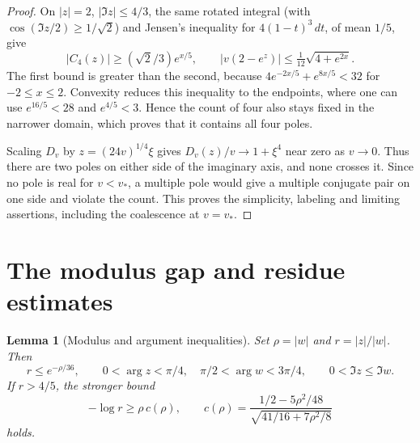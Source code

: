 \documentclass[11pt]{article}
\newtheorem{lemma}{Lemma}
\begin{document}
\begin{proof}
On \(|z|=2\), \(|\Im z|\le4/3\), the same rotated integral (with \(\cos(\Im z/2)\ge1/\sqrt2\)) and Jensen's inequality for \(4(1-t)^3\,dt\), of mean \(1/5\), give
\[
|C_4(z)|\ge(\sqrt2/3)e^{x/5},\qquad
|v(2-e^z)|\le \tfrac1{12}\sqrt{4+e^{2x}}.
\]
The first bound is greater than the second, because \(4e^{-2x/5}+e^{8x/5}<32\) for \(-2\le x\le2\). Convexity reduces this inequality to the endpoints, where one can use \(e^{16/5}<28\) and \(e^{4/5}<3\). Hence the count of four also stays fixed in the narrower domain, which proves that it contains all four poles.

Scaling \(D_v\) by \(z=(24v)^{1/4}\xi\) gives \(D_v(z)/v\to1+\xi^4\) near zero as \(v\to0\). Thus there are two poles on either side of the imaginary axis, and none crosses it. Since no pole is real for \(v<v_*\), a multiple pole would give a multiple conjugate pair on one side and violate the count. This proves the simplicity, labeling and limiting assertions, including the coalescence at \(v=v_*\).
\end{proof}

\section{The modulus gap and residue estimates}

\begin{lemma}[Modulus and argument inequalities]\label{lem:gap}
Set \(\rho=|w|\) and \(r=|z|/|w|\). Then
\[
r\le e^{-\rho/36},\qquad
0<\arg z<\pi/4,\quad \pi/2<\arg w<3\pi/4,\qquad
0<\Im z\le\Im w.
\]
If \(r>4/5\), the stronger bound
\begin{equation}\label{eq:gap}
-\log r \ge \rho\,c(\rho),\qquad
c(\rho)=\frac{1/2-5\rho^2/48}{\sqrt{41/16+7\rho^2/8}}
\end{equation}
holds.
\end{lemma}
\end{document}

